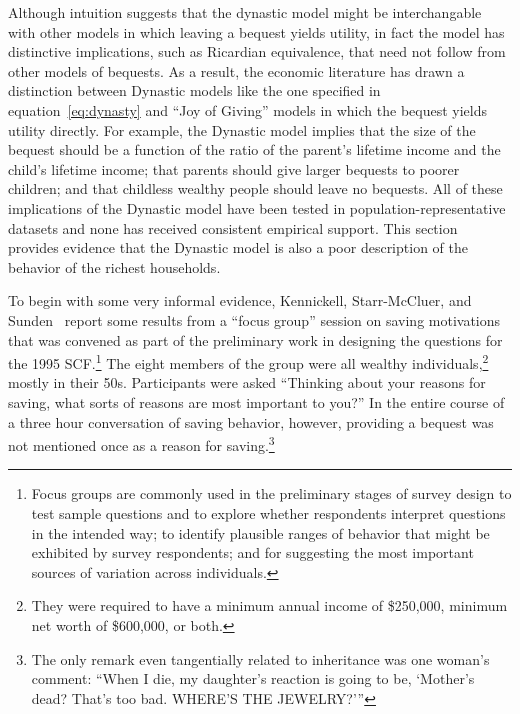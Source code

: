 \documentclass[titlepage,12pt]{article}
\begin{document}
Although intuition suggests that the dynastic model might be 
interchangable with other models in which leaving a bequest yields 
utility, in fact the model has distinctive implications, such as 
Ricardian equivalence, that need not follow from other models of 
bequests.  As a result, the economic literature has drawn a 
distinction between Dynastic models like the one specified in 
equation~\ref{eq:dynasty} and ``Joy of Giving'' models in which the 
bequest yields utility directly.  For example, the Dynastic model 
implies that the size of the bequest should be a function of the ratio 
of the parent's lifetime income and the child's lifetime income; that 
parents should give larger bequests to poorer children; and that 
childless wealthy people should leave no bequests.  All of these 
implications of the Dynastic model have been tested in 
population-representative datasets and none has received consistent 
empirical support.  This section provides evidence that the Dynastic 
model is also a poor description of the behavior of the richest 
households.

To begin with some very informal evidence, Kennickell, Starr-McCluer, 
and Sunden~\citeyear{scf:focusgroup} report some results from a ``focus 
group'' session on saving motivations that was convened as part of the 
preliminary work in designing the questions for the 1995 
SCF.\footnote{Focus groups are commonly used in the preliminary stages 
of survey design to test sample questions and to explore whether 
respondents interpret questions in the intended way; to identify 
plausible ranges of behavior that might be exhibited by survey 
respondents; and for suggesting the most important sources of 
variation across individuals.} The eight members of the group were all 
wealthy individuals,\footnote{They were required to have a minimum 
annual income of \$250,000, minimum net worth of \$600,000, or both.} 
mostly in their 50s.  Participants were asked ``Thinking about your 
reasons for saving, what sorts of reasons are most important to you?''  
In the entire course of a three hour conversation of saving behavior, 
however, providing a bequest was not mentioned once as a reason for 
saving.\footnote{The only remark even tangentially related to 
inheritance was one woman's comment: ``When I die, my daughter's 
reaction is going to be, `Mother's dead?  That's too bad.  WHERE'S THE 
JEWELRY?'''}
\end{document}
